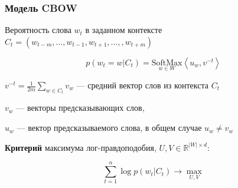 \documentclass[fullscreen=true, bookmarks=true, hyperref={pdfencoding=unicode}]{beamer}
\begin{document}
\begin{frame}
  \frametitle{Модель CBOW}

  Вероятность слова $w_t$ в заданном контексте $C_t = (w_{t-m}, \dots, w_{t-1}, w_{t+1}, \dots, , w_{t+m})$

  $$p(w_{t} = w|C_t) =    \underset{w \in W}{\text{SoftMax}} \left<u_w, v^{-t} \right> $$

  $v^{-t} = \frac{1}{2m} \sum\limits_{w \in C_t} v_w$ — средний вектор слов из контекста $C_t$

  $v_w$ — векторы предсказывающих слов,

  $u_w$ — вектор предсказываемого слова, в общем случае $u_w \neq v_w$

  \vspace{1cm}
  {\bf Критерий} максимума лог-правдоподобия, $U, V \in \mathbb{R}^{|W| \times d}$:

  $$ \sum\limits_{t=1}^n \log p(w_t|C_t) \to \max\limits_{U, V} $$

\end{frame}
\end{document}
